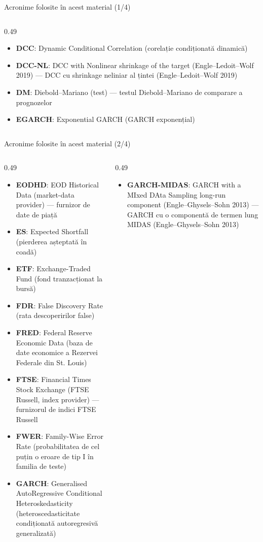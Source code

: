 \begin{frame}{Acronime folosite în acest material (1/4)}
\begin{columns}[T]
\begin{column}{0.49\textwidth}
\begin{itemize}
    \item \textbf{DCC}: Dynamic Conditional Correlation (corelație condiționată dinamică)
    \item \textbf{DCC-NL}: DCC with Nonlinear shrinkage of the target (Engle–Ledoit–Wolf 2019) — DCC cu shrinkage neliniar al țintei (Engle–Ledoit–Wolf 2019)
    \item \textbf{DM}: Diebold–Mariano (test) — testul Diebold–Mariano de comparare a prognozelor
    \item \textbf{EGARCH}: Exponential GARCH (GARCH exponențial)
\end{itemize}
\end{column}
\end{columns}
\end{frame}
\begin{frame}{Acronime folosite în acest material (2/4)}
\begin{columns}[T]
\begin{column}{0.49\textwidth}
\begin{itemize}\setlength{\itemsep}{0pt}
    \item \textbf{EODHD}: EOD Historical Data (market-data provider) — furnizor de date de piață
    \item \textbf{ES}: Expected Shortfall (pierderea așteptată în coadă)
    \item \textbf{ETF}: Exchange-Traded Fund (fond tranzacționat la bursă)
    \item \textbf{FDR}: False Discovery Rate (rata descoperirilor false)
    \item \textbf{FRED}: Federal Reserve Economic Data (baza de date economice a Rezervei Federale din St. Louis)
    \item \textbf{FTSE}: Financial Times Stock Exchange (FTSE Russell, index provider) — furnizorul de indici FTSE Russell
    \item \textbf{FWER}: Family-Wise Error Rate (probabilitatea de cel puțin o eroare de tip I în familia de teste)
    \item \textbf{GARCH}: Generalised AutoRegressive Conditional Heteroskedasticity (heteroscedasticitate condiționată autoregresivă generalizată)
\end{itemize}
\end{column}
\begin{column}{0.49\textwidth}
\begin{itemize}\setlength{\itemsep}{0pt}
    \item \textbf{GARCH-MIDAS}: GARCH with a MIxed DAta Sampling long-run component (Engle–Ghysels–Sohn 2013) — GARCH cu o componentă de termen lung MIDAS (Engle–Ghysels–Sohn 2013)

\end{itemize}
\end{column}
\end{columns}
\end{frame}

